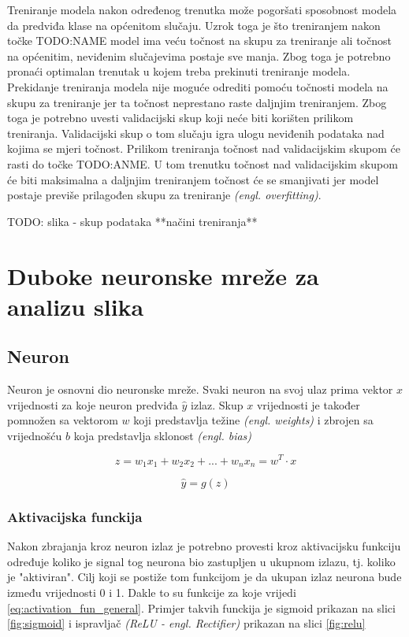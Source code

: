 \documentclass[times, utf8, zavrsni,numeric,pstricks]{fer}
\begin{document}
Treniranje modela nakon određenog trenutka može pogoršati sposobnost modela da predviđa klase na općenitom slučaju. Uzrok toga je što treniranjem nakon točke TODO:NAME model ima veću točnost na skupu za treniranje ali točnost na općenitim, neviđenim slučajevima postaje sve manja. Zbog toga je potrebno pronaći optimalan trenutak u kojem treba prekinuti treniranje modela. Prekidanje treniranja modela nije moguće odrediti pomoću točnosti modela na skupu za treniranje jer ta točnost neprestano raste daljnjim treniranjem. Zbog toga je potrebno uvesti validacijski skup koji neće biti korišten prilikom treniranja. Validacijski skup o tom slučaju igra ulogu neviđenih podataka nad kojima se mjeri točnost. Prilikom treniranja točnost nad validacijskim skupom će rasti do točke TODO:ANME. U tom trenutku točnost nad validacijskim skupom će biti maksimalna a daljnjim treniranjem točnost će se smanjivati jer model postaje previše prilagođen skupu za treniranje \textit{(engl. overfitting)}. 

TODO: slika - skup podataka  
**načini treniranja**

\section{Duboke neuronske mreže za analizu slika}
\subsection{Neuron}
Neuron je osnovni dio neuronske mreže. Svaki neuron na svoj ulaz prima vektor $x$ vrijednosti za koje neuron predviđa $\hat{y}$ izlaz. Skup $x$ vrijednosti je također pomnožen sa vektorom $w$ koji predstavlja težine \textit{(engl. weights)} i zbrojen sa vrijednošću $b$ koja predstavlja sklonost \textit{(engl. bias)}


\begin{equation}\label{eq:neuron}
	z=w_1x_1+w_2x_2+...+w_nx_n=w^{T} \cdot x
\end{equation}

\begin{equation}\label{eq:neuron}
	\hat{y} = g(z)
\end{equation}

\subsubsection{Aktivacijska funckija}

Nakon zbrajanja kroz neuron izlaz je potrebno provesti kroz aktivacijsku funkciju određuje koliko je signal tog neurona bio zastupljen u ukupnom izlazu, tj. koliko je "aktiviran". Cilj koji se postiže tom funkcijom je da ukupan izlaz neurona bude između vrijednosti 0 i 1. Dakle to su funkcije za koje vrijedi \ref{eq:activation_fun_general}. Primjer takvih funckija je sigmoid prikazan na slici \ref{fig:sigmoid} i ispravljač \textit{(ReLU - engl. Rectifier)} prikazan na slici \ref{fig:relu}
\end{document}
